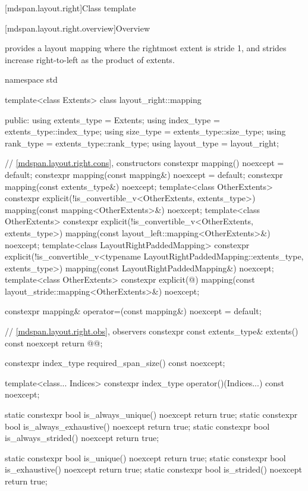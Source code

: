 [mdspan.layout.right]{Class template }

[mdspan.layout.right.overview]{Overview}

\pnum
{} provides a layout mapping
where the rightmost extent is stride 1, and
strides increase right-to-left as the product of extents.

\begin{codeblock}
namespace std {
  template<class Extents>
  class layout_right::mapping {
  public:
    using extents_type = Extents;
    using index_type = extents_type::index_type;
    using size_type = extents_type::size_type;
    using rank_type = extents_type::rank_type;
    using layout_type = layout_right;

    // \ref{mdspan.layout.right.cons}, constructors
    constexpr mapping() noexcept = default;
    constexpr mapping(const mapping&) noexcept = default;
    constexpr mapping(const extents_type&) noexcept;
    template<class OtherExtents>
      constexpr explicit(!is_convertible_v<OtherExtents, extents_type>)
        mapping(const mapping<OtherExtents>&) noexcept;
    template<class OtherExtents>
      constexpr explicit(!is_convertible_v<OtherExtents, extents_type>)
        mapping(const layout_left::mapping<OtherExtents>&) noexcept;
    template<class LayoutRightPaddedMapping>
      constexpr explicit(!is_convertible_v<typename LayoutRightPaddedMapping::extents_type,
                                           extents_type>)
        mapping(const LayoutRightPaddedMapping&) noexcept;
    template<class OtherExtents>
      constexpr explicit(@\seebelow@)
        mapping(const layout_stride::mapping<OtherExtents>&) noexcept;

    constexpr mapping& operator=(const mapping&) noexcept = default;

    // \ref{mdspan.layout.right.obs}, observers
    constexpr const extents_type& extents() const noexcept { return @@; }

    constexpr index_type required_span_size() const noexcept;

    template<class... Indices>
      constexpr index_type operator()(Indices...) const noexcept;

    static constexpr bool is_always_unique() noexcept { return true; }
    static constexpr bool is_always_exhaustive() noexcept { return true; }
    static constexpr bool is_always_strided() noexcept { return true; }

    static constexpr bool is_unique() noexcept { return true; }
    static constexpr bool is_exhaustive() noexcept { return true; }
    static constexpr bool is_strided() noexcept { return true; }

}}
\end{codeblock}
